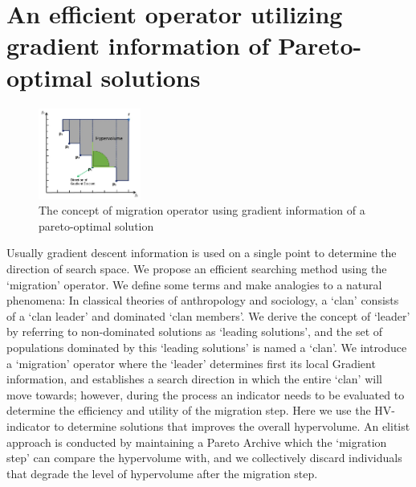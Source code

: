 \documentclass[%
 reprint,
 amsmath,amssymb,
 aps,
]{revtex4-2}
\begin{document}
\section{\label{sec:level1}	
An efficient operator utilizing\protect\\ gradient information of Pareto-optimal solutions
}

\begin{figure}[b]
\includegraphics[width=0.3\textwidth]{fig_4}
\caption{\label{fig:Migration operator} The concept of migration operator using gradient information of a pareto-optimal solution}
\end{figure}

Usually gradient descent information is used on a single point to determine the direction of search space. We propose an efficient searching method using the `migration' operator. We define some terms and make analogies to a natural phenomena: In classical theories of anthropology and sociology, a `clan' consists of a `clan leader' and dominated `clan members'. We derive the concept of `leader' by referring to non-dominated solutions as `leading solutions', and the set of populations dominated by this `leading solutions' is named a `clan'. We introduce a `migration' operator where the `leader' determines first its local Gradient information, and establishes a search direction in which the entire `clan' will move towards; however, during the process an indicator needs to be evaluated to determine the efficiency and utility of the migration step. Here we use the HV-indicator to determine solutions that improves the overall hypervolume. An elitist approach is conducted by maintaining a Pareto Archive which the `migration step' can compare the hypervolume with, and we collectively discard individuals that degrade the level of hypervolume after the migration step.
\nocite{*}

\newpage

\end{document}
